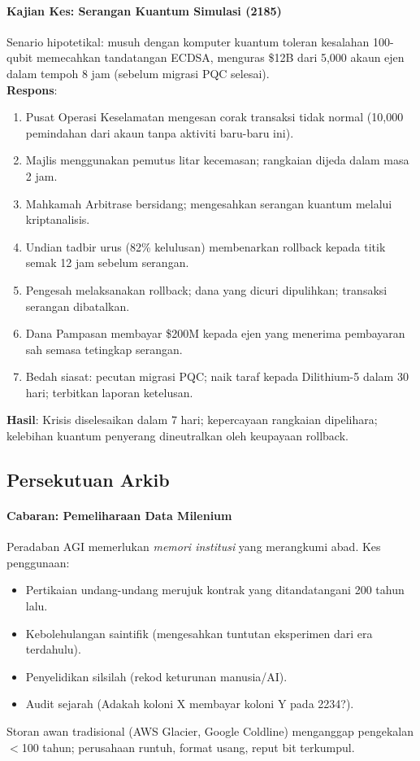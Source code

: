 \documentclass[11pt]{article}
\begin{document}
\paragraph{Kajian Kes: Serangan Kuantum Simulasi (2185)}
Senario hipotetikal: musuh dengan komputer kuantum toleran kesalahan 100-qubit memecahkan tandatangan ECDSA, menguras \$12B dari 5,000 akaun ejen dalam tempoh 8 jam (sebelum migrasi PQC selesai).\\
\textbf{Respons}:
\begin{enumerate}[noitemsep]
  \item Pusat Operasi Keselamatan mengesan corak transaksi tidak normal (10,000 pemindahan dari akaun tanpa aktiviti baru-baru ini).
  \item Majlis menggunakan pemutus litar kecemasan; rangkaian dijeda dalam masa 2 jam.
  \item Mahkamah Arbitrase bersidang; mengesahkan serangan kuantum melalui kriptanalisis.
  \item Undian tadbir urus (82\% kelulusan) membenarkan rollback kepada titik semak 12 jam sebelum serangan.
  \item Pengesah melaksanakan rollback; dana yang dicuri dipulihkan; transaksi serangan dibatalkan.
  \item Dana Pampasan membayar \$200M kepada ejen yang menerima pembayaran sah semasa tetingkap serangan.
  \item Bedah siasat: pecutan migrasi PQC; naik taraf kepada Dilithium-5 dalam 30 hari; terbitkan laporan ketelusan.
\end{enumerate}
\textbf{Hasil}: Krisis diselesaikan dalam 7 hari; kepercayaan rangkaian dipelihara; kelebihan kuantum penyerang dineutralkan oleh keupayaan rollback.

\subsection{Persekutuan Arkib}

\paragraph{Cabaran: Pemeliharaan Data Milenium}
Peradaban AGI memerlukan \emph{memori institusi} yang merangkumi abad. Kes penggunaan:
\begin{itemize}[noitemsep]
  \item Pertikaian undang-undang merujuk kontrak yang ditandatangani 200 tahun lalu.
  \item Kebolehulangan saintifik (mengesahkan tuntutan eksperimen dari era terdahulu).
  \item Penyelidikan silsilah (rekod keturunan manusia/AI).
  \item Audit sejarah (Adakah koloni X membayar koloni Y pada 2234?).
\end{itemize}
Storan awan tradisional (AWS Glacier, Google Coldline) menganggap pengekalan $<$100 tahun; perusahaan runtuh, format usang, reput bit terkumpul.
\end{document}

